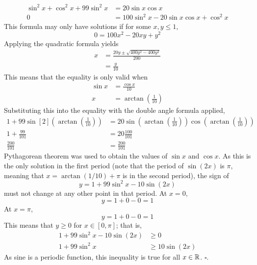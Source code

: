 \documentclass[../MATH135.tex]{subfiles}
\begin{document}
\begin{enumerate}
\begin{align*}
								\sin^2x + \cos^2x + 99\sin^2x &= 20\sin x\cos x \\
								0 &= 100\sin^2x - 20\sin x \cos x  + \cos^2x
							\end{align*}
							This formula may only have solutions if for some \(x, y \le 1\),
							\[0 = 100x^2 - 20xy + y^2\]
							Applying the quadratic formula yields
							\begin{align*}
								x &= \frac{20y \pm \sqrt{400y^2 - 400y^2}}{200}	\\
									&= \frac{y}{10}
							\end{align*}
							This means that the equality is only valid when
							\begin{align*}
								\sin x &= \frac{\cos x}{10}	\\
								x &= \arctan(\frac{1}{10})
							\end{align*}
							Substituting this into the equality with the double angle formula applied,
							\begin{align*}
								1 + 99\sin[2](\arctan(\frac{1}{10})) &= 20\sin(\arctan(\frac{1}{10}))\cos(\arctan(\frac{1}{10})) \\
								1 + \frac{99}{101} &= 20\frac{100}{101} \\
								\frac{200}{101} &= \frac{200}{101}
							\end{align*}
							Pythagorean theorem was used to obtain the values of \(\sin x\) and \(\cos x\).
							As this is the only solution in the first period (note that the period of \(\sin(2x)\) is \(\pi\), meaning that \(x = \arctan(1/10) + \pi\) is in the second period), the sign of
							\[y = 1 + 99\sin^2x - 10\sin(2x)\]
							must not change at any other point in that period. At \(x = 0\),
							\[y = 1 + 0 - 0 = 1\]
							At \(x = \pi\),
							\[y = 1 + 0 - 0 = 1\]
							This means that \(y \ge 0\) for \(x \in [0, \pi]\); that is,
							\begin{align*}
								1 + 99\sin^2x - 10\sin(2x) &\ge 0 \\
								1 + 99\sin^2x &\ge 10\sin(2x)
							\end{align*}
							As sine is a periodic function, this inequality is true for all \(x \in \mathbb{R}\). \(\square\). 
		\end{enumerate}
\end{document}
